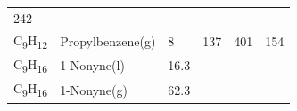 \documentclass[
]{book}
\theoremstyle{definition}
\theoremstyle{definition}
\theoremstyle{definition}
\theoremstyle{remark}
\begin{document}
\begin{longtable}[]{@{}llllll@{}}
\begin{minipage}[t]{0.14\columnwidth}
242\strut
\end{minipage}\tabularnewline
\begin{minipage}[t]{0.07\columnwidth}\raggedright
C\textsubscript{9}H\textsubscript{12}\strut
\end{minipage} & \begin{minipage}[t]{0.17\columnwidth}\raggedright
Propylbenzene(g)\strut
\end{minipage} & \begin{minipage}[t]{0.15\columnwidth}\raggedright
8\strut
\end{minipage} & \begin{minipage}[t]{0.15\columnwidth}\raggedright
137\strut
\end{minipage} & \begin{minipage}[t]{0.14\columnwidth}\raggedright
401\strut
\end{minipage} & \begin{minipage}[t]{0.14\columnwidth}\raggedright
154\strut
\end{minipage}\tabularnewline
\begin{minipage}[t]{0.07\columnwidth}\raggedright
C\textsubscript{9}H\textsubscript{16}\strut
\end{minipage} & \begin{minipage}[t]{0.17\columnwidth}\raggedright
1-Nonyne(l)\strut
\end{minipage} & \begin{minipage}[t]{0.15\columnwidth}\raggedright
16.3\strut
\end{minipage} & \begin{minipage}[t]{0.15\columnwidth}\raggedright
\strut
\end{minipage} & \begin{minipage}[t]{0.14\columnwidth}\raggedright
\strut
\end{minipage} & \begin{minipage}[t]{0.14\columnwidth}\raggedright
\strut
\end{minipage}\tabularnewline
\begin{minipage}[t]{0.07\columnwidth}\raggedright
C\textsubscript{9}H\textsubscript{16}\strut
\end{minipage} & \begin{minipage}[t]{0.17\columnwidth}\raggedright
1-Nonyne(g)\strut
\end{minipage} & \begin{minipage}[t]{0.15\columnwidth}\raggedright
62.3\strut
\end{minipage} & \begin{minipage}[t]{0.15\columnwidth}\raggedright

\end{minipage}
\end{longtable}
\end{document}
